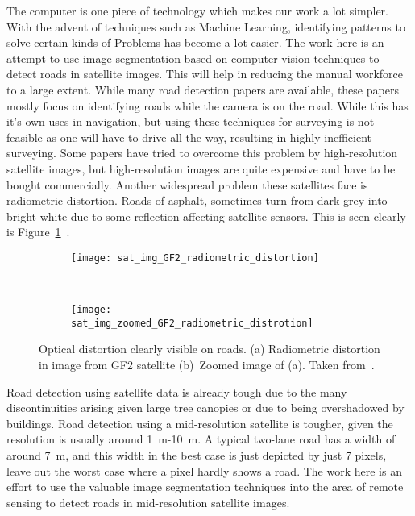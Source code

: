 The computer is one piece of technology which makes our work a lot simpler. With the advent of techniques such as Machine Learning, identifying patterns to solve certain kinds of Problems has become a lot easier. The work here is an attempt to use image segmentation based on computer vision techniques to detect roads in satellite images. This will help in reducing the manual workforce to a large extent. While many road detection papers are available, these papers mostly focus on identifying roads while the camera is on the road. While this has it's own uses in navigation, but using these techniques for surveying is not feasible as one will have to drive all the way, resulting in highly inefficient surveying. Some papers have tried to overcome this problem by high-resolution satellite images, but high-resolution images are quite expensive and have to be bought commercially. Another widespread problem these satellites face is radiometric distortion. Roads of asphalt, sometimes turn from dark grey into bright white due to some reflection affecting satellite sensors. This is seen clearly is Figure~\ref{fig:sat_img_radiometric_distortion}~\cite{GF2-imageCaseStudy}.

\begin{figure}[h!]
  \centering
  \begin{subfigure}{0.48\textwidth}
    \texttt{[image: sat\_img\_GF2\_radiometric\_distortion]}
    \caption{}
  \end{subfigure}~
  \begin{subfigure}{0.48\textwidth}
    \texttt{[image: sat\_img\_zoomed\_GF2\_radiometric\_distrotion]}
    \caption{}
  \end{subfigure}
  \caption[Optical distortion clearly visible on roads]{Optical distortion clearly visible on roads. (a) Radiometric distortion in image from GF2 satellite (b)~Zoomed image of (a). Taken from~\cite{GF2-imageCaseStudy}.}
  \label{fig:sat_img_radiometric_distortion}
\end{figure}

Road detection using satellite data is already tough due to the many discontinuities arising given large tree canopies or due to being overshadowed by buildings. Road detection using a mid-resolution satellite is tougher, given the resolution is usually around 1~m-10~m. A typical two-lane road has a width of around 7~m, and this width in the best case is just depicted by just 7 pixels, leave out the worst case where a pixel hardly shows a road. The work here is an effort to use the valuable image segmentation techniques into the area of remote sensing to detect roads in mid-resolution satellite images.